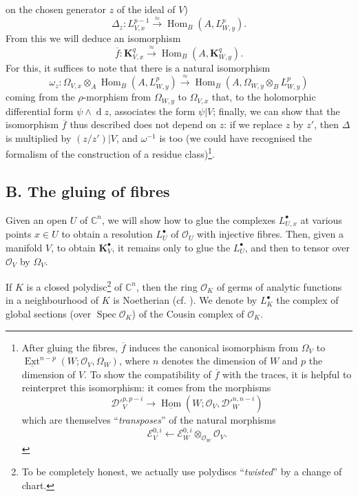 \documentclass[british]{article}
\begin{document}
on the chosen generator \(z\) of the ideal of \(V\)) \[
  \Delta_z\colon
  L_{V,x}^{p-1}
  \xrightarrow{\approx} \operatorname{Hom}_B(A,L_{W,y}^p).
\] From this we will deduce an isomorphism \[
  \overline{f}\colon
  \mathbf{K}_{V,x}^q
  \xrightarrow{\approx} \operatorname{Hom}_B(A,\mathbf{K}_{W,y}^q).
\] For this, it suffices to note that there is a natural isomorphism \[
  \omega_z\colon
  \Omega_{V,x}\otimes_A\operatorname{Hom}_B(A,L_{W,y}^p)
  \xrightarrow{\approx} \operatorname{Hom}_B(A,\Omega_{W,y}\otimes_B L_{W,y}^p)
\] coming from the \(\rho\)-morphism from \(\Omega_{W,y}\) to
\(\Omega_{V,x}\) that, to the holomorphic differential form
\(\psi\wedge\operatorname{d}{z}\), associates the form \(\psi|V\);
finally, we can show that the isomorphism \(\overline{f}\) thus
described does not depend on \(z\): if we replace \(z\) by \(z'\), then
\(\Delta\) is multiplied by \((z/z')|V\), and \(\omega^{-1}\) is too (we
could have recognised the formalism of the construction of a residue
class)\footnote{After gluing the fibres, \(\overline{f}\) induces the
  canonical isomorphism from \(\Omega_V\) to
  \(\underline{\operatorname{Ext}}^{n-p}(W;{\mathscr{O}}_V,\Omega_W)\),
  where \(n\) denotes the dimension of \(W\) and \(p\) the dimension of
  \(V\). To show the compatibility of \(\overline{f}\) with the traces,
  it is helpful to reinterpret this isomorphism: it comes from the
  morphisms \[
    {{\mathscr{D}}'}_V^{p,p-i}
    \to \underline{\operatorname{Hom}}(W;{\mathscr{O}}_V,{{\mathscr{D}}'}_W^{n,n-i})
  \] which are themselves ``\emph{transposes}'' of the natural morphisms
  \[
    {\mathscr{E}}_V^{0,i}
    \leftarrow {\mathscr{E}}_W^{0,i}\otimes_{{\mathscr{O}}_W}{\mathscr{O}}_V.
  \]}.

\subsection*{B. The gluing of fibres}\label{section-5.b}

Given an open \(U\) of \(\mathbb{C}^n\), we will show how to glue the
complexes \(L_{U,x}^\bullet\) at various points \(x\in U\) to obtain a
resolution \(L_U^\bullet\) of \({\mathscr{O}}_U\) with injective fibres.
Then, given a manifold \(V\), to obtain \(\mathbf{K}_V^\bullet\), it
remains only to glue the \(L_U^\bullet\), and then to tensor over
\({\mathscr{O}}_V\) by \(\Omega_V\).

If \(K\) is a closed polydisc\footnote{To be completely honest, we
  actually use polydiscs ``\emph{twisted}'' by a change of chart.} of
\(\mathbb{C}^n\), then the ring \({\mathscr{O}}_K\) of germs of analytic
functions in a neighbourhood of \(K\) is Noetherian (cf. \autocite{5}).
We denote by \(L_K^\bullet\) the complex of global sections (over
\(\operatorname{Spec}{{\mathscr{O}}_K}\)) of the Cousin complex of
\({\mathscr{O}}_K\).
\end{document}
